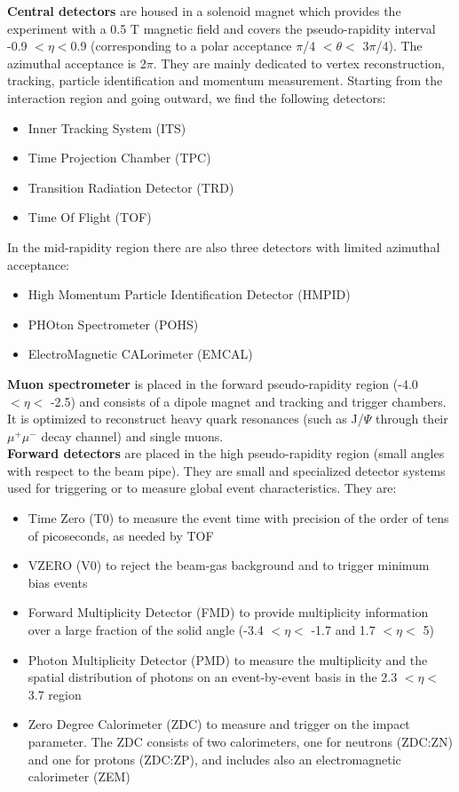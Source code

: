 \textbf{Central detectors} are housed in a solenoid magnet which provides the experiment with a 0.5 T magnetic field and covers the pseudo-rapidity interval -0.9 $< \eta <$0.9 (corresponding to a polar acceptance $\pi$/4 $< \theta <$ 3$\pi$/4). The azimuthal   acceptance is 2$\pi$. They are mainly dedicated to vertex reconstruction, tracking, particle identification and momentum measurement. Starting from the interaction region and going outward, we find the following detectors: 
\begin{itemize}
\item Inner Tracking System (ITS)
\item Time Projection Chamber (TPC)
\item Transition Radiation Detector (TRD)
\item Time Of Flight (TOF)
\end{itemize}


In the mid-rapidity region there are also three detectors with limited azimuthal acceptance: 
\begin{itemize}
\item High Momentum Particle Identification Detector (HMPID)
\item PHOton Spectrometer (POHS)
\item ElectroMagnetic CALorimeter (EMCAL)
\end{itemize}


\textbf{Muon spectrometer} is placed in the forward pseudo-rapidity region (-4.0 $< \eta <$ -2.5) and consists of a dipole magnet and tracking and trigger chambers. It is optimized to reconstruct heavy quark resonances (such as J/$\Psi$ through their $\mu^{+}\mu^{-}$ decay channel) and single muons. \\

\textbf{Forward detectors} are placed in the high pseudo-rapidity region (small angles with respect to the beam pipe). They are small and specialized detector systems used for triggering or to measure global event characteristics. They are:

\begin{itemize}
\item Time Zero (T0) to measure the event time with precision of the order of tens of picoseconds, as needed by TOF
\item VZERO (V0) to reject the beam-gas background and to trigger minimum bias events
\item Forward Multiplicity Detector (FMD) to provide multiplicity information over a large fraction of the solid angle (-3.4 $< \eta <$ -1.7 and 1.7 $< \eta <$ 5)
\item Photon Multiplicity Detector (PMD) to measure the multiplicity and the spatial distribution of photons on an event-by-event basis in the 2.3 $< \eta <$ 3.7 region
\item Zero Degree Calorimeter (ZDC) to measure and trigger on the impact parameter. The ZDC consists of two calorimeters, one for neutrons (ZDC:ZN) and one for protons (ZDC:ZP), and includes also an electromagnetic calorimeter (ZEM)
\end{itemize}

